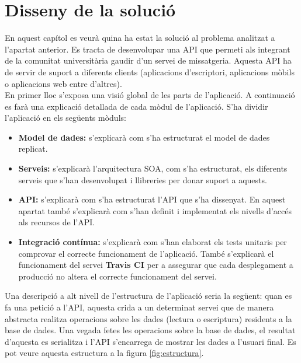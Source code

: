 \chapter{Disseny de la solució}\label{disseny}
En aquest capítol es veurà quina ha estat la solució al problema analitzat a l'apartat anterior. Es tracta de desenvolupar una \ac{API} que permeti als integrant de la comunitat universitària gaudir d'un servei de missatgeria. Aquesta \ac{API} ha de servir de suport a diferents clients (aplicacions d'escriptori, aplicacions mòbils o aplicacions web entre d'altres). \\

En primer lloc s'exposa una visió global de les parts de l'aplicació. A continuació es farà una explicació detallada de cada mòdul de l'aplicació. S'ha dividir l'aplicació en els següents mòduls: 
\begin{itemize}

	\item \textbf{Model de dades:} s'explicarà com s'ha estructurat el model de dades replicat.
	\item \textbf{Serveis:} s'explicarà l'arquitectura \ac{SOA}, com s'ha estructurat, els diferents serveis que s'han desenvolupat i llibreries per donar suport a aquests.
	\item \textbf{\ac{API}:} s'explicarà com s'ha estructurat l'\ac{API} que s'ha dissenyat. En aquest apartat també s'explicarà com s'han definit i implementat els nivells d'accés als recursos de l'\ac{API}.
	\item \textbf{Integració contínua:} s'explicarà com s'han elaborat els tests unitaris per comprovar el correcte funcionament de l'aplicació. També s'explicarà el funcionament del servei \textbf{Travis CI} per a assegurar que cada desplegament a producció no altera el correcte funcionament del servei.
	
\end{itemize}

Una descripció a alt nivell de l'estructura de l'aplicació seria la següent: quan es fa una petició a l'\ac{API}, aquesta crida a un determinat servei que de manera abstracta realitza operacions sobre les dades (lectura o escriptura) residents a la base de dades. Una vegada fetes les operacions sobre la base de dades, el resultat d'aquesta es serialitza i l'\ac{API} s'encarrega de mostrar les dades a l'usuari final. Es pot veure aquesta estructura a la figura \ref{fig:estructura}.

